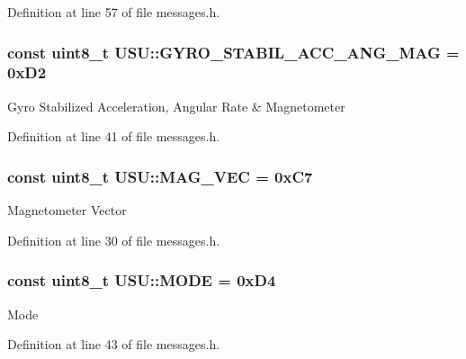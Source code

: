 \-Definition at line 57 of file messages.\-h.

\hypertarget{namespace_u_s_u_a21b21aa9bf4f65bb8f89f61c853b0d65}{
\subsubsection[{\-G\-Y\-R\-O\-\_\-\-S\-T\-A\-B\-I\-L\-\_\-\-A\-C\-C\-\_\-\-A\-N\-G\-\_\-\-M\-A\-G}]{\setlength{\rightskip}{0pt plus 5cm}const uint8\-\_\-t {\bf \-U\-S\-U\-::\-G\-Y\-R\-O\-\_\-\-S\-T\-A\-B\-I\-L\-\_\-\-A\-C\-C\-\_\-\-A\-N\-G\-\_\-\-M\-A\-G} = 0x\-D2}}\label{namespace_u_s_u_a21b21aa9bf4f65bb8f89f61c853b0d65}
\-Gyro \-Stabilized \-Acceleration, \-Angular \-Rate \& \-Magnetometer 

\-Definition at line 41 of file messages.\-h.

\hypertarget{namespace_u_s_u_a85ca84f12076e3251addb0c96317c83a}{
\subsubsection[{\-M\-A\-G\-\_\-\-V\-E\-C}]{\setlength{\rightskip}{0pt plus 5cm}const uint8\-\_\-t {\bf \-U\-S\-U\-::\-M\-A\-G\-\_\-\-V\-E\-C} = 0x\-C7}}\label{namespace_u_s_u_a85ca84f12076e3251addb0c96317c83a}
\-Magnetometer \-Vector 

\-Definition at line 30 of file messages.\-h.

\hypertarget{namespace_u_s_u_afb689aa4352de24daaa765fd9e625ae3}{
\subsubsection[{\-M\-O\-D\-E}]{\setlength{\rightskip}{0pt plus 5cm}const uint8\-\_\-t {\bf \-U\-S\-U\-::\-M\-O\-D\-E} = 0x\-D4}}\label{namespace_u_s_u_afb689aa4352de24daaa765fd9e625ae3}
\-Mode 

\-Definition at line 43 of file messages.\-h.

